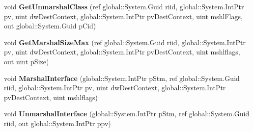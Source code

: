 \begin{DoxyCompactItemize}
\item 
\mbox{\label{interface_system_1_1_runtime_1_1_interop_services_1_1_i_marshal_____system___runtime___windows_runtime_ac0f4d724dea939dbf088fe46a53dec1a}} 
void {\bfseries Get\+Unmarshal\+Class} (ref global\+::\+System.\+Guid riid, global\+::\+System.\+Int\+Ptr pv, uint dw\+Dest\+Context, global\+::\+System.\+Int\+Ptr pv\+Dest\+Context, uint mshl\+Flags, out global\+::\+System.\+Guid p\+Cid)
\item 
\mbox{\label{interface_system_1_1_runtime_1_1_interop_services_1_1_i_marshal_____system___runtime___windows_runtime_a79af4aa5ca6d5a68217437912f3c9333}} 
void {\bfseries Get\+Marshal\+Size\+Max} (ref global\+::\+System.\+Guid riid, global\+::\+System.\+Int\+Ptr pv, uint dw\+Dest\+Context, global\+::\+System.\+Int\+Ptr pv\+Dest\+Context, uint mshlflags, out uint p\+Size)
\item 
\mbox{\label{interface_system_1_1_runtime_1_1_interop_services_1_1_i_marshal_____system___runtime___windows_runtime_a8598188070b1e46f9ba750c61433e126}} 
void {\bfseries Marshal\+Interface} (global\+::\+System.\+Int\+Ptr p\+Stm, ref global\+::\+System.\+Guid riid, global\+::\+System.\+Int\+Ptr pv, uint dw\+Dest\+Context, global\+::\+System.\+Int\+Ptr pv\+Dest\+Context, uint mshlflags)
\item 
\mbox{\label{interface_system_1_1_runtime_1_1_interop_services_1_1_i_marshal_____system___runtime___windows_runtime_a3e8bcee1d02a9ee6b7ef2e3996b54765}} 
void {\bfseries Unmarshal\+Interface} (global\+::\+System.\+Int\+Ptr p\+Stm, ref global\+::\+System.\+Guid riid, out global\+::\+System.\+Int\+Ptr ppv)
\item 
\mbox{\label{interface_system_1_1_runtime_1_1_interop_services_1_1_i_marshal_____system___runtime___windows_runtime_a3b9d876c6a7a35f23897b4e47568578c}} 

\end{DoxyCompactItemize}
